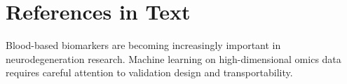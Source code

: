 \section{References in Text}

Blood-based biomarkers are becoming increasingly important in
neurodegeneration research.\citep{chen2024crossplatform}
Machine learning on high-dimensional omics data requires careful
attention to validation design and transportability.
\citep{chen2024crossplatform}
